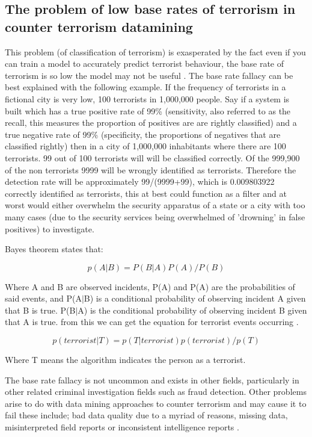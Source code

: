 \subsection{The problem of low base rates of terrorism in counter terrorism datamining}

This problem (of classification of terrorism) is exasperated by the fact even if you can train a model to accurately predict terrorist behaviour, the base rate of terrorism is so low the model may not be useful \citep{jensen2003information}. The base rate fallacy can be best explained with the following example. If the frequency of terrorists in a fictional city is very low, 100 terrorists in 1,000,000 people. Say if a system is built which has a true positive rate of 99\% (sensitivity, also referred to as the recall, this measures the proportion of positives are are rightly classified) and a true negative rate of 99\% (specificity, the proportions of negatives that are classified rightly) then in a city of 1,000,000 inhabitants where there are 100 terrorists. 99 out of 100 terrorists will will be classified correctly. Of the 999,900 of the non terrorists 9999 will be wrongly identified as terrorists. Therefore the detection rate will be approximately 99/(9999+99), which is  0.009803922 correctly identified as terrorists, this at best could function as a filter and at worst would either overwhelm the security apparatus of a state or a city with too many cases (due to the security services being overwhelmed of 'drowning' in false positives) to investigate. 

Bayes theorem states that:

\begin{equation} p(A|B)=P(B|A)P(A)/P(B) \label{eq1bayes}  \end{equation}

Where A and B are observed incidents, P(A) and P(A) are the probabilities of said events, and P(A$\vert$B) is a conditional probability of observing incident A given that B is true. P(B$\vert$A) is the conditional probability of observing incident B given that A is true. from this we can get the equation for terrorist events occurring  \label{eq2bayes}.
 
\begin{equation} p(terrorist|T)=p(T|terrorist)p(terrorist)/p(T) \label{eq2bayes}  \end{equation}

Where T means the algorithm indicates the person as a terrorist.

The base rate fallacy is not uncommon and exists in other fields, particularly in other related criminal investigation fields such as fraud detection. Other problems arise to do with data mining approaches to counter terrorism and may cause it to fail these include; bad data quality due to a myriad of reasons, missing data, misinterpreted field reports or inconsistent intelligence reports \citep{thuraisingham2004data}. 

